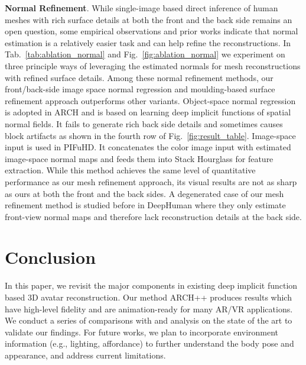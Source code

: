 \documentclass[10pt,twocolumn,letterpaper]{article}
\newcommand{\beforesection}{\vspace{-1.5mm}}
\newcommand{\aftersection}{\vspace{-1.5mm}}
\begin{document}
\textbf{Normal Refinement}. While single-image based direct inference of human meshes with rich surface details at both the front and the back side remains an open question, some empirical observations and prior works indicate that normal estimation is a relatively easier task and can help refine the reconstructions. In Tab.~\ref{tab:ablation_normal} and Fig.~\ref{fig:ablation_normal} we experiment on three principle ways of leveraging the estimated normals for mesh reconstructions with refined surface details. Among these normal refinement methods, our front/back-side image space normal regression and moulding-based surface refinement approach outperforms other variants. Object-space normal regression is adopted in ARCH and is based on learning deep implicit functions of spatial normal fields. It fails to generate rich back side details and sometimes causes block artifacts as shown in the fourth row of Fig.~\ref{fig:result_table}. Image-space input is used in PIFuHD. It concatenates the color image input with estimated image-space normal maps and feeds them into Stack Hourglass for feature extraction. While this method achieves the same level of quantitative performance as our mesh refinement approach, its visual results are not as sharp as ours at both the front and the back sides. A degenerated case of our mesh refinement method is studied before in DeepHuman where they only estimate front-view normal maps and therefore lack reconstruction details at the back side.

\beforesection
\section{Conclusion} \label{sec:conclusion}
\aftersection

In this paper, we revisit the major components in existing deep implicit function based 3D avatar reconstruction. Our method ARCH++ produces results which have high-level fidelity and are animation-ready for many AR/VR applications. We conduct a series of comparisons with and analysis on the state of the art to validate our findings. For future works, we plan to incorporate environment information (e.g., lighting, affordance) to further understand the body pose and appearance, and address current limitations.


{\small


}
\end{document}
